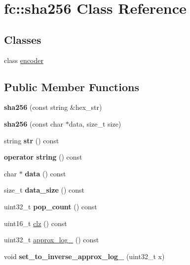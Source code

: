 \hypertarget{classfc_1_1sha256}{}\section{fc\+:\+:sha256 Class Reference}
\label{classfc_1_1sha256}
\subsection*{Classes}
\begin{DoxyCompactItemize}
\item 
class \mbox{\hyperlink{classfc_1_1sha256_1_1encoder}{encoder}}
\end{DoxyCompactItemize}
\subsection*{Public Member Functions}
\begin{DoxyCompactItemize}
\item 
\mbox{\label{classfc_1_1sha256_a2a1d39cf9b7689a82028025e289b0dc8}} 
{\bfseries sha256} (const string \&hex\+\_\+str)
\item 
\mbox{\label{classfc_1_1sha256_a9aead627c02ee18a90641474e20a07ae}} 
{\bfseries sha256} (const char $\ast$data, size\+\_\+t size)
\item 
\mbox{\label{classfc_1_1sha256_adeb506911c181a91aefbb2623b92fced}} 
string {\bfseries str} () const
\item 
\mbox{\label{classfc_1_1sha256_adca0f6cfdec275d1c4bab58221643fdf}} 
{\bfseries operator string} () const
\item 
\mbox{\label{classfc_1_1sha256_aac0fd4604e9a085b73d81651363e87ef}} 
char $\ast$ {\bfseries data} () const
\item 
\mbox{\label{classfc_1_1sha256_ac7722b7428b1db345f1b7fab7f4d5774}} 
size\+\_\+t {\bfseries data\+\_\+size} () const
\item 
\mbox{\label{classfc_1_1sha256_a460958d9d4b8a64517c86f64a0028096}} 
uint32\+\_\+t {\bfseries pop\+\_\+count} () const
\item 
uint16\+\_\+t \mbox{\hyperlink{classfc_1_1sha256_a3216a8dc2e6f346a2d892b3e8f8fcf1e}{clz}} () const
\item 
uint32\+\_\+t \mbox{\hyperlink{classfc_1_1sha256_a6969c0815acf46aebe70253fb9356078}{approx\+\_\+log\+\_}} () const
\item 
\mbox{\label{classfc_1_1sha256_af6069761a6e19b377c022ec25e99a12d}} 
void {\bfseries set\+\_\+to\+\_\+inverse\+\_\+approx\+\_\+log\+\_} (uint32\+\_\+t x)
\end{DoxyCompactItemize}
